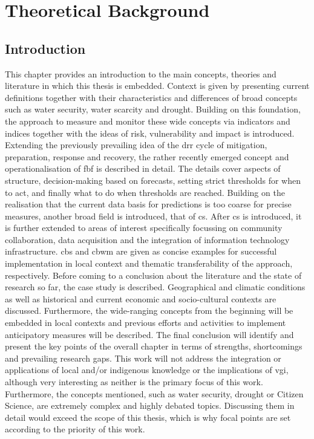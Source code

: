 
\chapter{Theoretical Background} %

\label{Chapter2} %

\section{Introduction}

This chapter provides an introduction to the main concepts, theories and literature in which this thesis is embedded. Context is given by presenting current definitions together with their characteristics and differences of broad concepts such as water security, water scarcity and drought. Building on this foundation, the approach to measure and monitor these wide concepts via indicators and indices together with the ideas of risk, vulnerability and impact is introduced.
Extending the previously prevailing idea of the \acrfull*{drr} cycle of mitigation, preparation, response and recovery, the rather recently emerged concept and operationalisation of \acrfull{fbf} is described in detail. The details cover aspects of structure, decision-making based on forecasts, setting strict thresholds for when to act, and finally what to do when thresholds are reached.
Building on the realisation that the current data basis for predictions is too coarse for precise measures, another broad field is introduced, that of \acrfull*{cs}. After \acrshort{cs} is introduced, it is further extended to areas of interest specifically focussing on community collaboration, data acquisition and the integration of information technology infrastructure. \acrfull{cbs} and \acrfull*{cbwm} are given as concise examples for successful implementation in local context and thematic transferability of the approach, respectively.
Before coming to a conclusion about the literature and the state of research so far, the case study is described. Geographical and climatic conditions as well as historical and current economic and socio-cultural contexts are discussed. Furthermore, the wide-ranging concepts from the beginning will be embedded in local contexts and previous efforts and activities to implement anticipatory measures will be described.
The final conclusion will identify and present the key points of the overall chapter in terms of strengths, shortcomings and prevailing research gaps.
This work will not address the integration or applications of local and/or indigenous knowledge or the implications of \acrfull*{vgi}, although very interesting as neither is the primary focus of this work. Furthermore, the concepts mentioned, such as water security, drought or Citizen Science, are extremely complex and highly debated topics. Discussing them in detail would exceed the scope of this thesis, which is why focal points are set according to the priority of this work.

